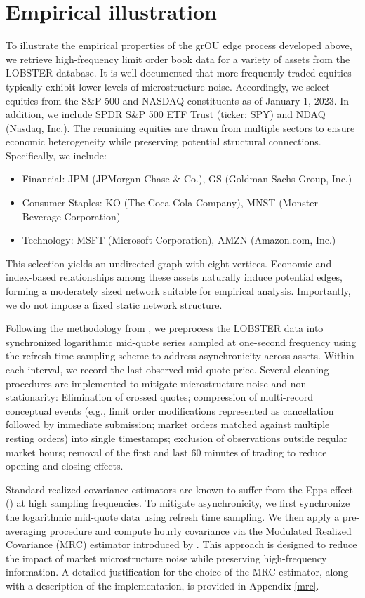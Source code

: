\documentclass[12pt]{amsart}
\numberwithin{equation}{section}
\newcommand{\1}{\mathbf{1}}
\begin{document}
\section{Empirical illustration}
\label{Empirical illustration}
To illustrate the empirical properties of the grOU edge process developed above, we retrieve high-frequency limit order book data for a variety of assets from the LOBSTER database. It is well documented that more frequently traded equities typically exhibit lower levels of microstructure noise. Accordingly, we select equities from the S\&P 500 and NASDAQ constituents as of January 1, 2023. In addition, we include SPDR S\&P 500 ETF Trust (ticker: SPY) and NDAQ (Nasdaq, Inc.). The remaining equities are drawn from multiple sectors to ensure economic heterogeneity while preserving potential structural connections. Specifically, we include:
\begin{itemize}
    \item Financial: JPM (JPMorgan Chase \& Co.), GS (Goldman Sachs Group, Inc.)
\item Consumer Staples: KO (The Coca-Cola Company), MNST (Monster Beverage Corporation)
\item Technology: MSFT (Microsoft Corporation), AMZN (Amazon.com, Inc.)
\end{itemize}
This selection yields an undirected graph with eight vertices. Economic and index-based relationships among these assets naturally induce potential edges, forming a moderately sized network suitable for empirical analysis. Importantly, we do not impose a fixed static network structure. 

Following the methodology from \cite{lucchese2024short}, we preprocess the LOBSTER data into synchronized logarithmic mid-quote series sampled at one-second frequency using the refresh-time sampling scheme to address asynchronicity across assets. Within each interval, we record the last observed mid-quote price. Several cleaning procedures are implemented to mitigate microstructure noise and non-stationarity: Elimination of crossed quotes; compression of multi-record conceptual events (e.g., limit order modifications represented as cancellation followed by immediate submission; market orders matched against multiple resting orders) into single timestamps; exclusion of observations outside regular market hours; removal of the first and last 60 minutes of trading to reduce opening and closing effects.

Standard realized covariance estimators are known to suffer from the Epps effect (\cite{epps1979comovements}) at high sampling frequencies. To mitigate asynchronicity, we first synchronize the logarithmic mid-quote data using refresh time sampling. We then apply a pre-averaging procedure and compute hourly covariance via the Modulated Realized Covariance (MRC) estimator introduced by \cite{christensen2010pre}. This approach is designed to reduce the impact of market microstructure noise while preserving high-frequency information. A detailed justification for the choice of the MRC estimator, along with a description of the implementation, is provided in Appendix \ref{mrc}.
\end{document}
